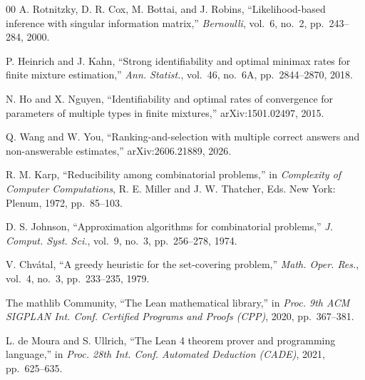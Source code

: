 \begin{thebibliography}{00}
 A. Rotnitzky, D. R. Cox, M. Bottai, and J. Robins, ``Likelihood-based
inference with singular information matrix,'' \emph{Bernoulli}, vol.~6, no.~2, pp.~243--284,
2000.

 P. Heinrich and J. Kahn, ``Strong identifiability and optimal minimax
rates for finite mixture estimation,'' \emph{Ann. Statist.}, vol.~46, no.~6A, pp.~2844--2870,
2018.

 N. Ho and X. Nguyen, ``Identifiability and optimal rates of convergence
for parameters of multiple types in finite mixtures,'' arXiv:1501.02497, 2015.

 Q. Wang and W. You, ``Ranking-and-selection with multiple correct
answers and non-answerable estimates,'' arXiv:2606.21889, 2026.

 R. M. Karp, ``Reducibility among combinatorial problems,'' in
\emph{Complexity of Computer Computations}, R. E. Miller and J. W. Thatcher, Eds. New York:
Plenum, 1972, pp.~85--103.

 D. S. Johnson, ``Approximation algorithms for combinatorial problems,''
\emph{J. Comput. Syst. Sci.}, vol.~9, no.~3, pp.~256--278, 1974.

 V. Chv\'atal, ``A greedy heuristic for the set-covering problem,''
\emph{Math. Oper. Res.}, vol.~4, no.~3, pp.~233--235, 1979.

 The mathlib Community, ``The Lean mathematical library,'' in
\emph{Proc. 9th ACM SIGPLAN Int. Conf. Certified Programs and Proofs (CPP)}, 2020,
pp.~367--381.

 L. de Moura and S. Ullrich, ``The Lean 4 theorem prover and
programming language,'' in \emph{Proc. 28th Int. Conf. Automated Deduction (CADE)}, 2021,
pp.~625--635.

\end{thebibliography}


